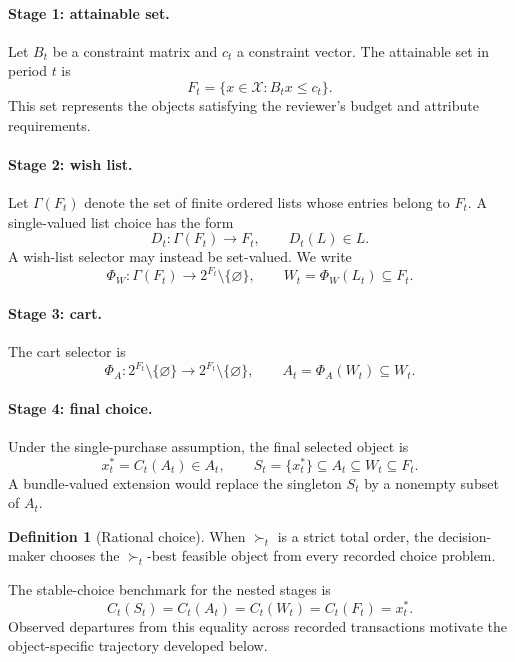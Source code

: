 \documentclass[conference]{IEEEtran}
\theoremstyle{plain}
\theoremstyle{definition}
\newtheorem{definition}{Definition}
\theoremstyle{remark}
\begin{document}
	\paragraph{Stage 1: attainable set.}
	Let $B_t$ be a constraint matrix and $c_t$ a constraint vector. The attainable set in period $t$ is
	\begin{equation}\label{key2b}
		F_t=\{x\in\mathcal X:B_t x\leq c_t\}.
	\end{equation}
	This set represents the objects satisfying the reviewer’s budget and attribute requirements.

	\paragraph{Stage 2: wish list.}
	Let $\Gamma(F_t)$ denote the set of finite ordered lists whose entries belong to $F_t$. A single-valued list choice has the form
	\begin{equation}
		D_t:\Gamma(F_t)\longrightarrow F_t,
		\qquad D_t(L)\in L.
	\end{equation}
	A wish-list selector may instead be set-valued. We write
	\begin{equation}
		\Phi_W:\Gamma(F_t)\longrightarrow 2^{F_t}\setminus\{\varnothing\},
		\qquad W_t=\Phi_W(L_t)\subseteq F_t.
	\end{equation}

	\paragraph{Stage 3: cart.}
	The cart selector is
	\begin{equation}
		\Phi_A:2^{F_t}\setminus\{\varnothing\}
		\longrightarrow 2^{F_t}\setminus\{\varnothing\},
		\qquad A_t=\Phi_A(W_t)\subseteq W_t.
	\end{equation}

	\paragraph{Stage 4: final choice.}
	Under the single-purchase assumption, the final selected object is
	\begin{equation}
		x_t^{*}=C_t(A_t)\in A_t,
		\qquad S_t=\{x_t^{*}\}\subseteq A_t\subseteq W_t\subseteq F_t.
	\end{equation}
	A bundle-valued extension would replace the singleton $S_t$ by a nonempty subset of $A_t$.

	\begin{definition}[Rational choice]
		When $\succ_t$ is a strict total order, the decision-maker chooses the $\succ_t$-best feasible object from every recorded choice problem.
	\end{definition}
	The stable-choice benchmark for the nested stages is
	\begin{equation}
		C_t(S_t)=C_t(A_t)=C_t(W_t)=C_t(F_t)=x_t^{*}.
	\end{equation}
	Observed departures from this equality across recorded transactions motivate the object-specific trajectory developed below.
\end{document}
